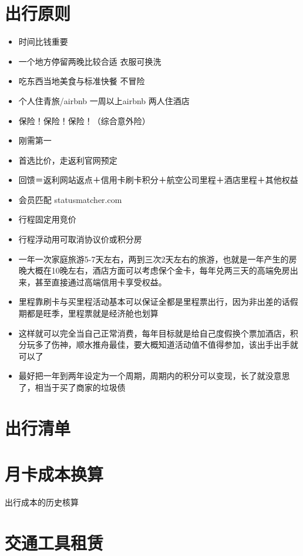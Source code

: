 \documentclass[
  letterpaper,
  DIV=11,
  numbers=noendperiod]{scrreprt}
\providecommand{\tightlist}{%
  \setlength{\itemsep}{0pt}\setlength{\parskip}{0pt}}\usepackage{longtable,booktabs,array}
\begin{document}
\section{出行原则}\label{ux51faux884cux539fux5219}

\begin{itemize}
\tightlist
\item
  时间比钱重要
\item
  一个地方停留两晚比较合适 衣服可换洗
\item
  吃东西当地美食与标准快餐 不冒险
\item
  个人住青旅/airbnb 一周以上airbnb 两人住酒店
\item
  保险！保险！保险！（综合意外险）
\item
  刚需第一
\item
  首选比价，走返利官网预定
\item
  回馈＝返利网站返点＋信用卡刷卡积分＋航空公司里程＋酒店里程＋其他权益
\item
  会员匹配 statusmatcher.com
\item
  行程固定用竞价
\item
  行程浮动用可取消协议价或积分房
\item
  一年一次家庭旅游5-7天左右，两到三次2天左右的旅游，也就是一年产生的房晚大概在10晚左右，酒店方面可以考虑保个金卡，每年兑两三天的高端免房出来，甚至直接通过高端信用卡享受权益。
\item
  里程靠刷卡与买里程活动基本可以保证全都是里程票出行，因为非出差的话假期都是旺季，里程票就是经济舱也划算
\item
  这样就可以完全当自己正常消费，每年目标就是给自己度假换个票加酒店，积分玩多了伤神，顺水推舟最佳，要大概知道活动值不值得参加，该出手出手就可以了
\item
  最好把一年到两年设定为一个周期，周期内的积分可以变现，长了就没意思了，相当于买了商家的垃圾债
\end{itemize}

\section{出行清单}\label{ux51faux884cux6e05ux5355}

\section{月卡成本换算}\label{ux6708ux5361ux6210ux672cux6362ux7b97}

出行成本的历史核算

\section{交通工具租赁}\label{ux4ea4ux901aux5de5ux5177ux79dfux8d41}
\end{document}

